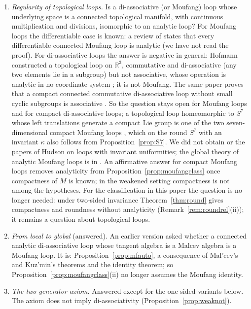 \documentclass[11pt,reqno]{amsart}
\theoremstyle{definition}
\theoremstyle{remark}
\numberwithin{equation}{section}
\newcommand{\R}{\mathbb{R}}
\begin{document}
\begin{enumerate}[label=\textbf{Q\arabic*.},leftmargin=2.6em]
\item \emph{Regularity of topological loops.}  Is a di-associative (or Moufang) loop whose underlying space is a connected
topological manifold, with continuous multiplication and divisions, isomorphic to an analytic loop?  For Moufang loops the differentiable case is known: a review of \cite{NS98} states that every differentiable connected
Moufang loop is analytic (we have not read the proof).  For di-associative loops the answer is negative in general: Hofmann
constructed a topological loop on $\R^3$, commutative and di-associative (any two elements lie in a subgroup) but not associative, whose
operation is analytic in no coordinate system \cite[(9.1)--(9.3)]{Hofmann58II}; it is not Moufang.  The same paper proves that a compact
connected commutative di-associative loop without small cyclic subgroups is associative \cite[(8.30)]{Hofmann58II}.  So the question
stays open for Moufang loops and for compact di-associative loops; a topological loop homeomorphic to $S^7$ whose left translations
generate a compact Lie group is one of the two seven-dimensional compact Moufang loops \cite[Thm.~6]{FS15}, which on the round $S^7$
with an invariant $\kappa$ also follows from Proposition~\ref{prop:S7}.  We did not obtain \cite{HS90} or the papers of Hudson on loops
with invariant uniformities; the global theory of analytic Moufang loops is in \cite{Kerdman,NS02}.  An affirmative answer for compact
Moufang loops removes analyticity from Proposition~\ref{prop:moufangclass} once compactness of $M$ is known; in the weakened setting
compactness is not among the hypotheses.  For the classification in this paper the question is no longer needed: under two-sided
invariance Theorem~\ref{thm:round} gives compactness and roundness without analyticity (Remark~\ref{rem:roundrel}(ii)); it remains a
question about topological loops.
\item \emph{From local to global} (answered).  An earlier version asked whether a connected analytic di-associative loop whose tangent
algebra is a Malcev algebra is a Moufang loop.  It is: Proposition~\ref{prop:mfauto}, a consequence of Mal'cev's and Kuz'min's
theorems and the identity theorem; so Proposition~\ref{prop:moufangclass}(ii) no longer assumes the Moufang identity.
\item \emph{The two-generator axiom.}  Answered except for the one-sided variants below.  The axiom does not imply di-associativity
(Proposition~\ref{prop:weaknot}).

\end{enumerate}
\end{document}
